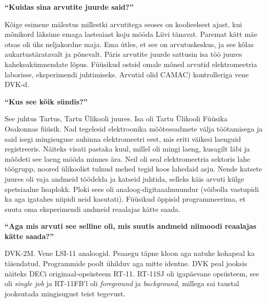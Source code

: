 
\textbf{\enquote{Kuidas sina arvutite juurde said?}}

Kõige esimene mälestus millestki arvutitega seoses on koolieelsest ajast, kui mõnikord läksime emaga lasteaiast koju mööda Liivi tänavat. Paremat kätt mäe otsas oli üks neljakordne maja. Ema ütles, et see on arvutuskeskus, ja see kõlas aukartustäratavalt ja põnevalt.
Päris arvutite juurde sattusin isa töö juures kaheksakümnendate lõpus. Füüsikud ostsid omale mõned arvutid elektromeetria laborisse, eksperimendi juhtimiseks. Arvutid olid CAMAC) kontrolleriga vene DVK-d.

\textbf{\enquote{Kus see kõik sündis?}}

See juhtus Tartus, Tartu Ülikooli juures. Isa oli Tartu Ülikooli Füüsika Osakonnas füüsik. Nad tegelesid elektroonika mõõteseadmete välja töötamisega ja said isegi mingisuguse auhinna elektromeetri eest, mis eriti väikesi laenguid registreeris. Näiteks visati pastaka kuul, millel oli mingi laeng, kusagilt läbi ja mõõdeti see laeng mööda minnes ära. Neil oli seal elektromeetria sektoris lahe töögrupp, noored ülikoolist tulnud mehed tegid koos lahedaid asju. Nende katsete juures oli vaja andmeid töödelda ja katseid juhtida, selleks käis arvuti külge spetsiaalne lisaplokk. Ploki sees oli analoog-digitaaalmuundur (võibolla vastupidi ka aga igatahes niipidi neid kasutati). Füüsikud õppisid programmeerima, et suuta oma eksperimendi andmeid reaalajas kätte saada. 

\textbf{\enquote{Aga mis arvuti see selline oli, mis suutis andmeid niimoodi reaalajas kätte saada?}}

DVK-2M. Vene LSI-11 analoogid. Peaaegu täpne kloon aga natuke kohapeal ka täiendatud. Programmide poolt ühilduv aga mitte identne. DVK peal jooksis näiteks DECi originaal-opsüsteem RT-11. RT-11SJ oli igapäevane opsüsteem, see oli \emph{single job} ja RT-11FB'l oli \emph{foreground} ja \emph{background}, millega sai taustal jooksutada mingisugust teist tegevust. 

